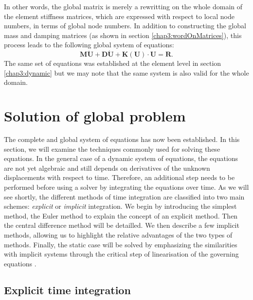 In other words, the global matrix is merely a rewritting on the whole domain of the element stiffness matrices, which are expressed with respect to local node numbers, in terms of global node numbers. In addition to constructing the global mass and damping matrices (as shown in section \ref{chap3:wordOnMatrices}), this process leads to the following global system of equations:
\begin{equation}
\label{chap3:dynamic2}
\mathbf{M} \mathbf{\ddot U} + \mathbf{D} \mathbf{ \dot U} + \mathbf{K}(\mathbf{U}) \cdot \mathbf{U} = \mathbf{R}.
\end{equation}	
The same set of equations was established at the element level in section \ref{chap3:dynamic} but we may note that the same system is also valid for the whole domain. 


\section{Solution of global problem}
The complete and global system of equations has now been established. In this section, we will examine the techniques commonly used for solving these equations. In the general case of a dynamic system of equations, the equations are not yet algebraic and still depends on derivatives of the unknown displacements with respect to time. Therefore, an additional step needs to be performed before using a solver by integrating the equations over time. As we will see shortly, the different methods of time integration are classified into two main schemes: \emph{explicit} or \emph{implicit} integration. We begin by introducing the simplest method, the Euler method to explain the concept of an explicit method. Then the central difference method will be detailled. We then describe a few implicit methods, allowing us to highlight the relative advantages of the two types of methods. Finally, the static case will be solved by emphasizing the similarities with implicit systems through the critical step of linearisation of the governing equations \citep{Belytschko00}.

	\subsection{Explicit time integration}

